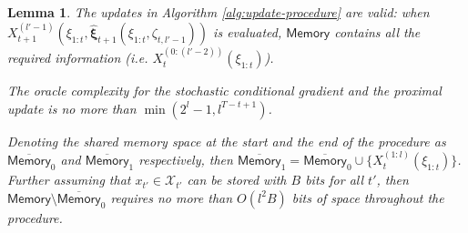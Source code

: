\documentclass[11pt,fullpage,letterpaper]{article}
\newcommand{\mc}{\mathcal}
\newcommand{\bx}{\boldsymbol{\xi}}
\newcommand{\memo}{\mathsf{Memory}}
\newtheorem{lemma}{Lemma}[section]
\begin{document}
\begin{lemma}\label{lm:procedure-prop}
    The updates in Algorithm \ref{alg:update-procedure} are valid: when $X_{t+1}^{(l'-1)}(\xi_{1:t},\widehat{\bx}_{t+1}(\xi_{1:t},\zeta_{t,l'-1}))$ is evaluated, $\memo$ contains all the required information (i.e. $X_{t}^{(0:(l'-2))}(\xi_{1:t})$).
    
The oracle complexity for the stochastic conditional gradient and the proximal update is no more than $\min(2^l-1,l^{T-t+1})$.

Denoting the shared memory space at the start and the end of the procedure as $\overline{\memo}_0$ and $\overline{\memo}_1$ respectively, then $\overline{\memo}_1 = \overline{\memo}_0\cup \{X_t^{(1:l)}(\xi_{1:t})\}$. Further assuming that $x_{t'}\in \mc X_{t'}$ can be stored with $B$ bits for all $t'$, then $\memo\setminus\overline{\memo}_0$ requires no more than $O(l^2B )$ bits of space throughout the procedure. 
\end{lemma}
\end{document}
